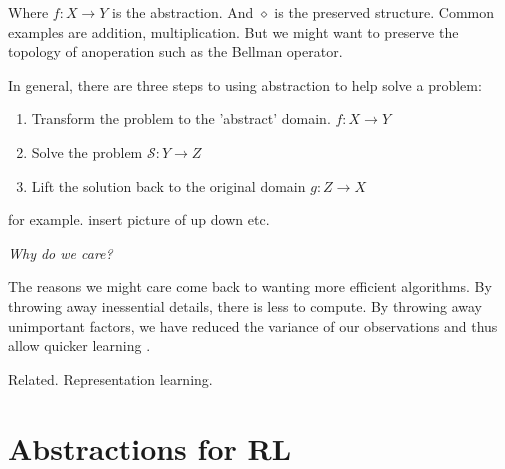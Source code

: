 Where $f: X\to Y$ is the abstraction. And $\diamond$ is the preserved structure.
Common examples are addition, multiplication. But we might want to preserve the topology of anoperation such as the Bellman operator.

In general, there are three steps to using abstraction to help solve a problem:

\begin{enumerate}
\tightlist
  \item Transform the problem to the 'abstract' domain. $f: X\to Y$
  \item Solve the problem $\mathcal S: Y \to Z$
  \item Lift the solution back to the original domain  $g:Z \to X$
\end{enumerate}

for example.
insert picture of up down etc.

\begin{displayquote}
 \textit{Why do we care?}
\end{displayquote}

The reasons we might care come back to wanting more efficient algorithms.
By throwing away inessential details, there is less to compute.
By throwing away unimportant factors, we have reduced the variance of our
observations and thus allow quicker learning \cite{Allen-Zhu2016a,Johnson2013a}.


%

{\color{red}Related. Representation learning.}

\section{Abstractions for RL}


